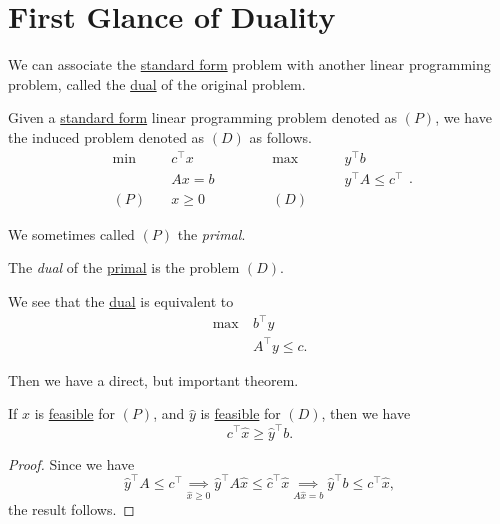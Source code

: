 \section{First Glance of Duality}
We can associate the \hyperref[def:standard-form]{standard form} problem with another linear programming problem, called the \hyperref[def:dual]{dual} of the original problem.
\begin{definition}\label{def:primal-and-dual}
	Given a \hyperref[def:standard-form]{standard form} linear programming problem denoted as \((P)\), we have the induced problem denoted as \((D)\) as follows.
	\[
		\begin{alignedat}{5}
			\min~&c^{\top}x\qquad\qquad &&\max ~ &&y^{\top}b\\
			&Ax = b && &&y^{\top}A\leq c^{\top}\\
			(P)\quad&x\geq  0 &&(D)\quad&&
		\end{alignedat}.
	\]
	\begin{definition}[Primal]\label{def:primal}
		We sometimes called \((P)\) the \emph{primal}.
	\end{definition}

	\begin{definition}[Dual]\label{def:dual}
		The \emph{dual} of the \hyperref[def:primal]{primal} is the problem \((D)\).
	\end{definition}
\end{definition}


\begin{note}
	We see that the \hyperref[def:dual]{dual} is equivalent to
	\[
		\begin{aligned}
			\max~ & b^{\top}y         \\
			      & A^{\top}y \leq c.
		\end{aligned}
	\]
\end{note}

Then we have a direct, but important theorem.
\begin{theorem}\label{thm:weak-duality-theorem}
	If \(\hat{x}\) is \hyperref[def:feasible-solution]{feasible} for \((P)\), and \(\hat{y}\) is \hyperref[def:feasible-solution]{feasible} for \((D)\), then we have
	\[
		c^{\top}\hat{x} \geq  \hat{y}^{\top} b.
	\]
\end{theorem}
\begin{proof}
	Since we have
	\[
		\hat{y}^{\top}A\leq c^{\top} \underset{\hat{x}\geq 0}{\implies} \hat{y}^{\top}A \hat{x} \leq \hat{c}^{\top} \hat{x} \underset{A \hat{x} = b}{\implies} \hat{y}^{\top}b \leq c^{\top} \hat{x},
	\]
	the result follows.
\end{proof}

